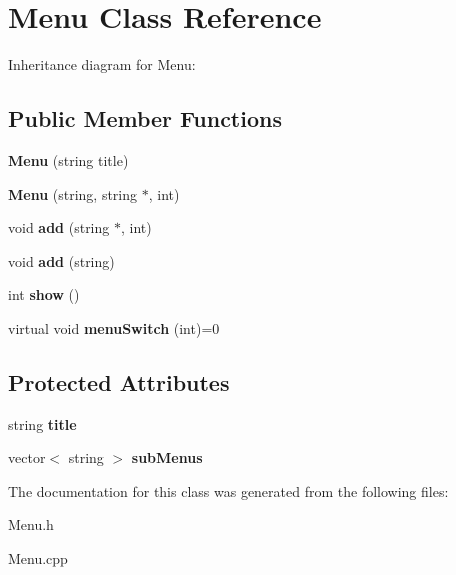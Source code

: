 \hypertarget{classMenu}{}\section{Menu Class Reference}
\label{classMenu}


Inheritance diagram for Menu\+:
\subsection*{Public Member Functions}
\begin{DoxyCompactItemize}
\item 
{\bfseries Menu} (string title)\hypertarget{classMenu_a3377fd5036a2f8f93eee473afd570185}{}\label{classMenu_a3377fd5036a2f8f93eee473afd570185}

\item 
{\bfseries Menu} (string, string $\ast$, int)\hypertarget{classMenu_a28dcf937389ad94a178caef7b28a11a8}{}\label{classMenu_a28dcf937389ad94a178caef7b28a11a8}

\item 
void {\bfseries add} (string $\ast$, int)\hypertarget{classMenu_a2be45a29dd0fa643d5fc118350bce944}{}\label{classMenu_a2be45a29dd0fa643d5fc118350bce944}

\item 
void {\bfseries add} (string)\hypertarget{classMenu_a5423c0d700c20bf8bdd0fb1dbf0c0f6f}{}\label{classMenu_a5423c0d700c20bf8bdd0fb1dbf0c0f6f}

\item 
int {\bfseries show} ()\hypertarget{classMenu_a346009151f57e18ffe0fa5a9dd89b1d6}{}\label{classMenu_a346009151f57e18ffe0fa5a9dd89b1d6}

\item 
virtual void {\bfseries menu\+Switch} (int)=0\hypertarget{classMenu_ae9d7af36b1a380e5e4b03ddbef9ceeca}{}\label{classMenu_ae9d7af36b1a380e5e4b03ddbef9ceeca}

\end{DoxyCompactItemize}
\subsection*{Protected Attributes}
\begin{DoxyCompactItemize}
\item 
string {\bfseries title}\hypertarget{classMenu_a0edddfda0319fc24d00ca6ed610ea59b}{}\label{classMenu_a0edddfda0319fc24d00ca6ed610ea59b}

\item 
vector$<$ string $>$ {\bfseries sub\+Menus}\hypertarget{classMenu_acfa8e5e2ebe7e383c2ea38c74be347c0}{}\label{classMenu_acfa8e5e2ebe7e383c2ea38c74be347c0}

\end{DoxyCompactItemize}


The documentation for this class was generated from the following files\+:\begin{DoxyCompactItemize}
\item 
Menu.\+h\item 
Menu.\+cpp\end{DoxyCompactItemize}
